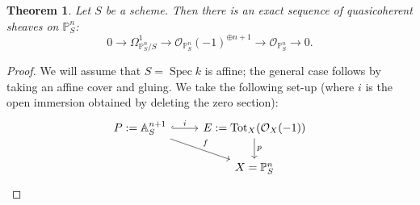 \documentclass[10pt]{article}
\newtheorem{thm}{Theorem}[section]
\theoremstyle{definition}
\DeclareMathOperator{\Spec}{Spec}
\DeclareMathOperator{\Tot}{Tot}
\newcommand{\PP}{\mathbb{P}}
\newcommand{\OO}{\mathcal{O}}
\begin{document}
\begin{thm}
Let $S$ be a scheme. Then there is an exact sequence of quasicoherent sheaves on $\mathbb{P}^n_S$:
$$0 \rightarrow \Omega^1_{\mathbb{P}^n_S/S} \rightarrow \OO_{\mathbb{P}^n_S}(-1)^{\oplus n+1} \rightarrow \OO_{\mathbb{P}^n_S} \rightarrow 0.$$
\end{thm}
\begin{proof}
We will assume that $S = \Spec k$ is affine; the general case follows by taking an affine cover and gluing.  We take the following set-up (where $i$ is the open immersion obtained by deleting the zero section):
$$\begin{tikzcd}
P := \mathbb{A}^{n+1}_S \arrow[dr, "f"] \arrow[r, hook, "i"] & E := \Tot_X(\OO_X(-1)) \arrow[d, "p"] \\
& X = \PP^n_S
\end{tikzcd}$$


\end{proof}
\end{document}
